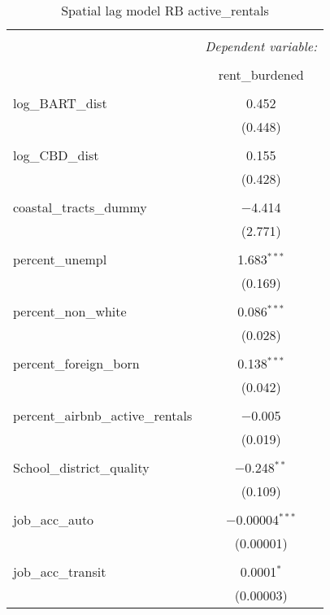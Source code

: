 \documentclass[10pt, letterpaper]{amsart}
\begin{document}
\begin{table}[H] \centering 
  \caption{Spatial lag model RB active\_rentals} 
  \label{} 
  \begin{tabular}{@{\extracolsep{5pt}}lc} 
    \\[-1.8ex]\hline 
    \hline \\[-1.8ex] 
    & \multicolumn{1}{c}{\textit{Dependent variable:}} \\ 
    \cline{2-2} 
    \\[-1.8ex] & rent\_burdened \\ 
    \hline \\[-1.8ex] 
    log\_BART\_dist & 0.452 \\ 
    & (0.448) \\ 
    & \\ 
    log\_CBD\_dist & 0.155 \\ 
    & (0.428) \\ 
    & \\ 
    coastal\_tracts\_dummy & $-$4.414 \\ 
    & (2.771) \\ 
    & \\ 
    percent\_unempl & 1.683$^{***}$ \\ 
    & (0.169) \\ 
    & \\ 
    percent\_non\_white & 0.086$^{***}$ \\ 
    & (0.028) \\ 
    & \\ 
    percent\_foreign\_born & 0.138$^{***}$ \\ 
    & (0.042) \\ 
    & \\ 
    percent\_airbnb\_active\_rentals & $-$0.005 \\ 
    & (0.019) \\ 
    & \\ 
    School\_district\_quality & $-$0.248$^{**}$ \\ 
    & (0.109) \\ 
    & \\ 
    job\_acc\_auto & $-$0.00004$^{***}$ \\ 
    & (0.00001) \\ 
    & \\ 
    job\_acc\_transit & 0.0001$^{*}$ \\ 
    & (0.00003) \\ 

\end{tabular}
\end{table}
\end{document}
